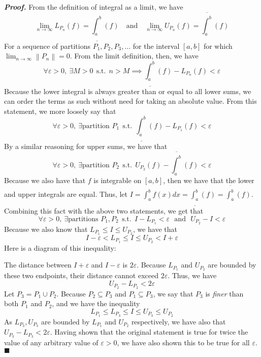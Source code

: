 \documentclass[10pt]{article}
\newcommand\norm[1]{\left\lVert#1\right\rVert}
\newenvironment{proof}{\par\textit{\textbf{Proof.}}}{\hfill$\blacksquare$}
\newcommand{\suchthat}{~~\text{s.t.}~~}
\begin{document}
\begin{proof}
    From the definition of integral as a limit, we have
$$
    \lim_{n\to\infty} L_{P_n}(f)=\underline{\int_a^b}(f)
    \quad\text{and}\quad
    \lim_{n\to\infty} U_{P_n}(f)=\overline{\int_a^b}(f)
$$
For a sequence of partitions $P_1,P_2,P_3,\dots$ for the interval $[a,b]$ for which $\displaystyle\lim_{n\to\infty}\norm{P_n}=0$.
From the limit definition, then, we have 
$$
    \forall \varepsilon>0,~\exists M>0\suchthat n>M\implies \underline{\int_a^b}(f)-L_{P_n}(f)<\varepsilon
$$
Because the lower integral is always greater than or equal to all lower sums, we can order the terms as such without need for taking an absolute value. From this statement, we more loosely say that
$$
    \forall \varepsilon>0,~\exists \text{partition $P_1$}\suchthat\underline{\int_a^b}(f)-L_{P_1}(f)<\varepsilon
$$
By a similar reasoning for upper sums, we have that
$$
    \forall \varepsilon>0,~\exists \text{partition $P_2$}\suchthat U_{P_2}(f)-\overline{\int_a^b}(f)<\varepsilon
$$
Because we also have that $f$ is integrable on $[a,b]$, then we have that the lower and upper integrals are equal. Thus, let $I=\int_a^bf(x)dx = \underline{\int_a^b}(f) = \overline{\int_a^b}(f)$. Combining this fact with the above two statements, we get that
$$
    \forall \varepsilon>0,~\exists \text{partitions $P_1,P_2$}\suchthat I-L_{P_1}<\varepsilon\text{~~and~~}U_{P_2}-I<\varepsilon
$$
Because we also know that $L_{P_1}\leq I \leq U_{P_2}$, we have that
$$
    I-\varepsilon < L_{P_1} \leq I \leq U_{P_2} < I+\varepsilon
$$
Here is a diagram of this inequality:
\begin{center}
\end{center}
The distance between $I+\varepsilon$ and $I-\varepsilon$ is $2\varepsilon$. Because $L_{P_1}$ and $U_{P_2}$ are bounded by these two endpoints, their distance cannot exceed $2\varepsilon$. Thus, we have
$$
    U_{P_2}-L_{P_2}<2\varepsilon
$$
Let $P_3=P_1\cup P_2$. Because $P_2\subseteq P_3$ and $P_1\subseteq P_3$, we say that $P_3$ is \textit{finer} than both $P_1$ and $P_2$, and we have the inequality
$$
    L_{P_1}\leq L_{P_3} \leq I \leq U_{P_3} \leq U_{P_2}
$$
As $L_{P_3},U_{P_3}$ are bounded by $L_{P_1}$ and $U_{P_2}$ respectively, we have also that $U_{P_3}-L_{P_3}<2\varepsilon$. Having shown that the original statement is true for twice the value of any arbitrary value of $\varepsilon>0$, we have also shown this to be true for all $\varepsilon$.
\end{proof}
\end{document}
